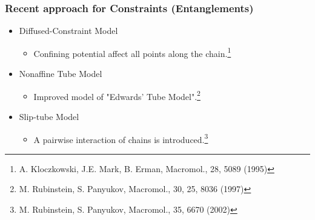 \documentclass[12pt, dvipdfmx]{beamer}
\begin{document}
\begin{frame}
	\frametitle{Recent approach for Constraints (Entanglements)}
	
		\begin{itemize}
			\item Diffused-Constraint Model
			\begin{itemize}
				\item Confining potential affect all points along the chain.\footnote{\tiny{A. Kloczkowski, J.E. Mark, B. Erman, Macromol., 28, 5089 (1995)}}
			\end{itemize}
			\item Nonaffine Tube Model
			\begin{itemize}
				\item Improved model of "Edwards' Tube Model".\footnote{\tiny{M. Rubinstein, S. Panyukov, Macromol., 30, 25, 8036 (1997)}}
			\end{itemize}
			\item Slip-tube Model
			\begin{itemize}
				\item A pairwise interaction of chains is introduced.\footnote{\tiny{M. Rubinstein, S. Panyukov, Macromol., 35, 6670 (2002)}}
			\end{itemize}
		\end{itemize}


\end{frame}
\end{document}
